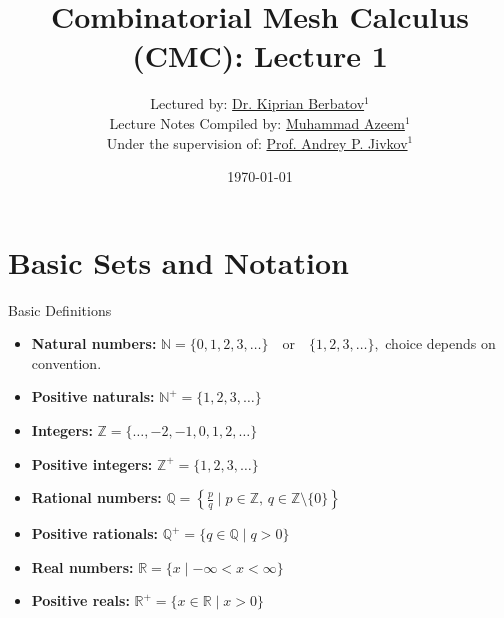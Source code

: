 \documentclass[11pt,aspectratio=43,ignorenonframetext,t]{beamer}
\title{Combinatorial Mesh Calculus (CMC): Lecture 1}
\author{Lectured by: \href{https://scholar.google.com/citations?user=x4R-snQAAAAJ&hl=en}{Dr. Kiprian Berbatov}$^1$\\
\smallskip
Lecture Notes Compiled by: \href{https://scholar.google.com/citations?user=CoIpITkAAAAJ&hl=en}{Muhammad Azeem}$^1$\\
\smallskip
Under the supervision of: \href{https://scholar.google.co.uk/citations?user=3nWJe5wAAAAJ&hl=en}{Prof. Andrey P. Jivkov}$^1$\\
\smallskip {\tiny $^1$Department of Mechanical and Aerospace Engineering, The University of Manchester, Oxford Road, Manchester M13 9PL, UK}
}
\date{\today}
\begin{document}
\begin{frame}
  \titlepage
\end{frame}


\section{Basic Sets and Notation}

\begin{frame}{Basic Definitions}
\begin{itemize}
  \item \textbf{Natural numbers:} 
     $\mathbb{N} = \{0,1,2,3,\dots\} \quad\text{or}\quad \{1,2,3,\dots\},$ choice depends on convention.
  \item \textbf{Positive naturals:}  $\mathbb{N}^{+} = \{1,2,3,\dots\}$
  \item \textbf{Integers:} $\mathbb{Z} = \{\dots,-2,-1,0,1,2,\dots\}$
  \item \textbf{Positive integers:}  $\mathbb{Z}^{+} = \{1,2,3,\dots\}$
  \item \textbf{Rational numbers:} $\mathbb{Q} = \left\{ \frac{p}{q} \mid p \in \mathbb{Z},\, q \in \mathbb{Z}\setminus\{0\} \right\}$
  \item \textbf{Positive rationals:} $\mathbb{Q}^{+} = \{q \in \mathbb{Q} \mid q > 0\}$
  \item \textbf{Real numbers:} $\mathbb{R} = \{ x \mid -\infty < x < \infty \}$
  \item \textbf{Positive reals:} $\mathbb{R}^{+} = \{ x \in \mathbb{R} \mid x > 0\}$
\end{itemize}
\end{frame}
\end{document}
